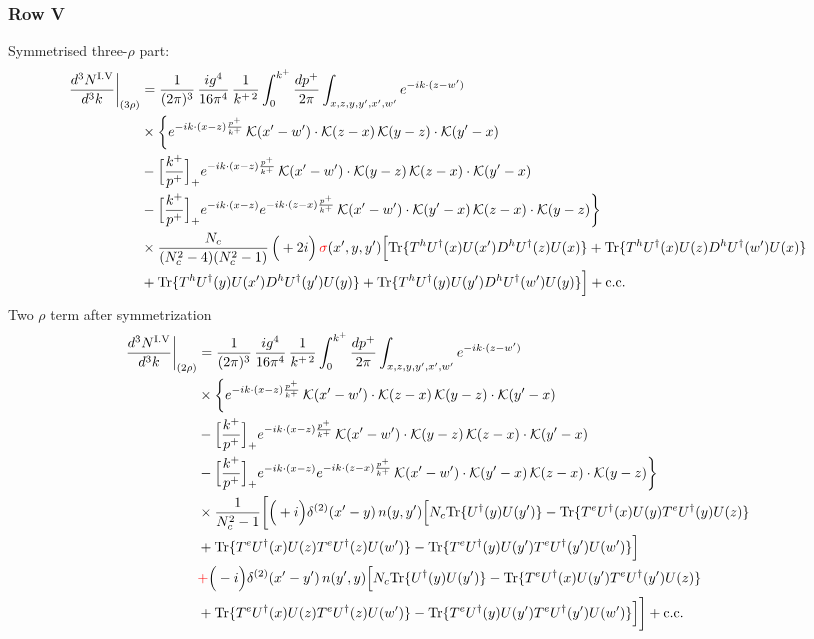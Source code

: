 \documentclass[9pt]{article}
\numberwithin{equation}{section}
\begin{document}
\subsubsection*{Row V}
Symmetrised three-$\rho$ part:
\begin{align}
\frac{d^{3}N^{\rm I.V}}{d^{3}k}\bigg|_{(3\rho)}&=\frac{1}{(2\pi)^{3}}\,\frac{ig^{4}}{16\pi^{4}}\,\frac{1}{k^{+\,2}}\int_{0}^{k^{+}}\frac{dp^{+}}{2\pi}\int_{x,z,y,y',x',w'}e^{-ik\cdot(z-w')}\notag\\
&\times\bigg\{e^{-ik\cdot(x-z)\frac{p^{+}}{k^{+}}}\,\mathcal{K}(x'-w')\cdot\mathcal{K}(z-x)\,\mathcal{K}(y-z)\cdot\mathcal{K}(y'-x)\notag\\
&-\Big[\frac{k^{+}}{p^{+}}\Big]_{+}e^{-ik\cdot(x-z)\frac{p^{+}}{k^{+}}}\,\mathcal{K}(x'-w')\cdot\mathcal{K}(y-z)\,\mathcal{K}(z-x)\cdot\mathcal{K}(y'-x)\notag\\
&-\Big[\frac{k^{+}}{p^{+}}\Big]_{+}e^{-ik\cdot(x-z)}e^{-ik\cdot(z-x)\frac{p^{+}}{k^{+}}}\,\mathcal{K}(x'-w')\cdot\mathcal{K}(y'-x)\,\mathcal{K}(z-x)\cdot\mathcal{K}(y-z)\bigg\}\notag\\
&\times \frac{N_{c}}{(N_{c}^{2}-4)(N_{c}^{2}-1)}\,\Big(+2i\Big)\,{\color{red}\sigma}(x',y,y')\Big[{\rm Tr}\{T^{h}U^{\dagger}(x)U(x')D^{h}U^{\dagger}(z)U(x)\}+{\rm Tr}\{T^{h}U^{\dagger}(x)U(z)D^{h}U^{\dagger}(w')U(x)\}\notag\\
& +{\rm Tr}\{T^{h}U^{\dagger}(y)U(x')D^{h}U^{\dagger}(y')U(y)\}+{\rm Tr}\{T^{h}U^{\dagger}(y)U(y')D^{h}U^{\dagger}(w')U(y)\}\Big]+{\rm c.c.}\label{eq:E-I.V-3}
\end{align}
Two $\rho$ term after symmetrization
\begin{align}
\frac{d^{3}N^{\rm I.V}}{d^{3}k}\bigg|_{(2\rho)} &=\frac{1}{(2\pi)^{3}}\,\frac{ig^{4}}{16\pi^{4}}\,\frac{1}{k^{+\,2}}\int_{0}^{k^{+}}\frac{dp^{+}}{2\pi}\int_{x,z,y,y',x',w'}e^{-ik\cdot(z-w')}\notag\\
&\times\bigg\{e^{-ik\cdot(x-z)\frac{p^{+}}{k^{+}}}\,\mathcal{K}(x'-w')\cdot\mathcal{K}(z-x)\,\mathcal{K}(y-z)\cdot\mathcal{K}(y'-x)\notag\\
&-\Big[\frac{k^{+}}{p^{+}}\Big]_{+}e^{-ik\cdot(x-z)\frac{p^{+}}{k^{+}}}\,\mathcal{K}(x'-w')\cdot\mathcal{K}(y-z)\,\mathcal{K}(z-x)\cdot\mathcal{K}(y'-x)\notag\\
&-\Big[\frac{k^{+}}{p^{+}}\Big]_{+}e^{-ik\cdot(x-z)}e^{-ik\cdot(z-x)\frac{p^{+}}{k^{+}}}\,\mathcal{K}(x'-w')\cdot\mathcal{K}(y'-x)\,\mathcal{K}(z-x)\cdot\mathcal{K}(y-z)\bigg\}\notag\\
&\times \frac{1}{N_{c}^{2}-1}\bigg[\Big(+i\Big)\delta^{(2)}(x'-y)\,n(y,y')\Big[N_{c}{\rm Tr}\{U^{\dagger}(y)U(y')\}-{\rm Tr}\{T^{e}U^{\dagger}(x)U(y)T^{e}U^{\dagger}(y)U(z)\}\notag\\
& +{\rm Tr}\{T^{e}U^{\dagger}(x)U(z)T^{e}U^{\dagger}(z)U(w')\}-{\rm Tr}\{T^{e}U^{\dagger}(y)U(y')T^{e}U^{\dagger}(y')U(w')\}\Big]\notag\\
& {\color{red}+}\Big(-i\Big)\delta^{(2)}(x'-y')\,n(y',y)\Big[N_{c}{\rm Tr}\{U^{\dagger}(y)U(y')\}-{\rm Tr}\{T^{e}U^{\dagger}(x)U(y')T^{e}U^{\dagger}(y')U(z)\}\notag\\
& +{\rm Tr}\{T^{e}U^{\dagger}(x)U(z)T^{e}U^{\dagger}(z)U(w')\}-{\rm Tr}\{T^{e}U^{\dagger}(y)U(y')T^{e}U^{\dagger}(y')U(w')\}\Big]\bigg]+{\rm c.c.}\label{eq:E-I.V-2}
\end{align}
\end{document}
